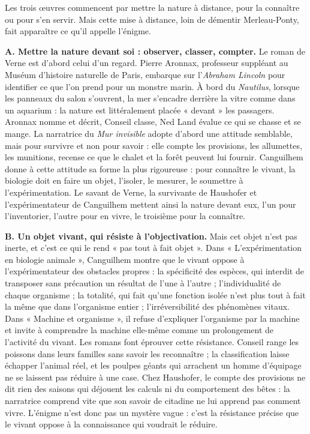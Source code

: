 \documentclass[11pt,a4paper]{article}
\begin{document}
Les trois œuvres commencent par mettre la nature à distance, pour la connaître ou pour s'en servir. Mais cette mise à distance, loin de démentir Merleau-Ponty, fait apparaître ce qu'il appelle l'énigme.

\textbf{A. Mettre la nature devant soi : observer, classer, compter.} Le roman de Verne est d'abord celui d'un regard. Pierre Aronnax, professeur suppléant au Muséum d'histoire naturelle de Paris, embarque sur l'\emph{Abraham Lincoln} pour identifier ce que l'on prend pour un monstre marin. À bord du \emph{Nautilus}, lorsque les panneaux du salon s'ouvrent, la mer s'encadre derrière la vitre comme dans un aquarium : la nature est littéralement placée « devant » les passagers. Aronnax nomme et décrit, Conseil classe, Ned Land évalue ce qui se chasse et se mange. La narratrice du \emph{Mur invisible} adopte d'abord une attitude semblable, mais pour survivre et non pour savoir : elle compte les provisions, les allumettes, les munitions, recense ce que le chalet et la forêt peuvent lui fournir. Canguilhem donne à cette attitude sa forme la plus rigoureuse : pour connaître le vivant, la biologie doit en faire un objet, l'isoler, le mesurer, le soumettre à l'expérimentation. Le savant de Verne, la survivante de Haushofer et l'expérimentateur de Canguilhem mettent ainsi la nature devant eux, l'un pour l'inventorier, l'autre pour en vivre, le troisième pour la connaître.

\textbf{B. Un objet vivant, qui résiste à l'objectivation.} Mais cet objet n'est pas inerte, et c'est ce qui le rend « pas tout à fait objet ». Dans « L'expérimentation en biologie animale », Canguilhem montre que le vivant oppose à l'expérimentateur des obstacles propres : la spécificité des espèces, qui interdit de transposer sans précaution un résultat de l'une à l'autre ; l'individualité de chaque organisme ; la totalité, qui fait qu'une fonction isolée n'est plus tout à fait la même que dans l'organisme entier ; l'irréversibilité des phénomènes vitaux. Dans « Machine et organisme », il refuse d'expliquer l'organisme par la machine et invite à comprendre la machine elle-même comme un prolongement de l'activité du vivant. Les romans font éprouver cette résistance. Conseil range les poissons dans leurs familles sans savoir les reconnaître ; la classification laisse échapper l'animal réel, et les poulpes géants qui arrachent un homme d'équipage ne se laissent pas réduire à une case. Chez Haushofer, le compte des provisions ne dit rien des saisons qui déjouent les calculs ni du comportement des bêtes : la narratrice comprend vite que son savoir de citadine ne lui apprend pas comment vivre. L'énigme n'est donc pas un mystère vague : c'est la résistance précise que le vivant oppose à la connaissance qui voudrait le réduire.
\end{document}
